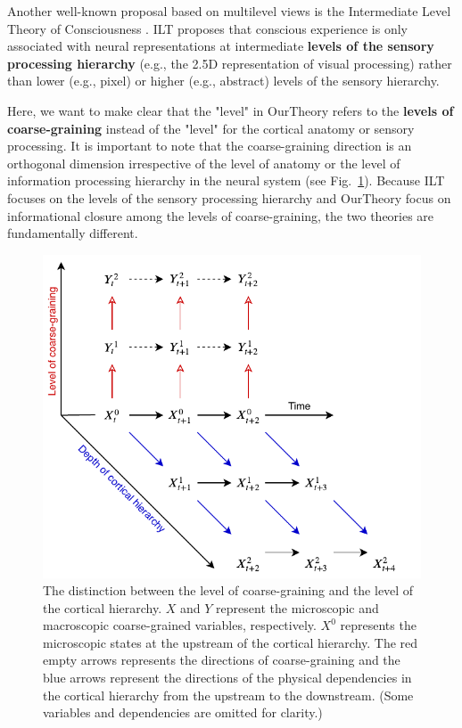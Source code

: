 \documentclass[utf8]{article}
\begin{document}
    		Another well-known proposal based on multilevel views is the Intermediate Level Theory of Consciousness \citep[ILT]{prinz2007intermediate, jackendoff1987consciousness}. ILT proposes that conscious experience is only associated with neural representations at intermediate \textbf{levels of the sensory processing hierarchy} (e.g., the 2.5D representation of visual processing) rather than lower (e.g., pixel) or higher (e.g., abstract) levels of the sensory hierarchy. 
    	
    		Here, we want to make clear that the "level" in \ac{OurTheory} refers to the \textbf{levels of coarse-graining} instead of the "level" for the cortical anatomy or sensory processing. It is important to note that the coarse-graining direction is an orthogonal dimension irrespective of the level of anatomy or the level of information processing hierarchy in the neural system (see Fig.~\ref{fig:hierarchy}). Because ILT focuses on the levels of the sensory processing hierarchy and \ac{OurTheory} focus on informational closure among the levels of coarse-graining, the two theories are fundamentally different.  
    		
    		
    		\begin{figure}[H]
    			\includegraphics[width=\textwidth]{WritingMaterials/Fig_SeperationOfCGandCortHierachy/SeperationOfCGandCortHierachy.pdf}
				\caption{The distinction between the level of coarse-graining and the level of the cortical hierarchy. $X$ and $Y$ represent the microscopic and macroscopic coarse-grained  variables, respectively. $X^0$ represents the microscopic states at the upstream of the cortical hierarchy. The red empty arrows represents the directions of coarse-graining and the blue arrows represent the directions of the physical dependencies in the cortical hierarchy from the upstream to the downstream. (Some variables and dependencies are omitted for clarity.)}
				\label{fig:hierarchy}
    		\end{figure} 
    		
\end{document}
